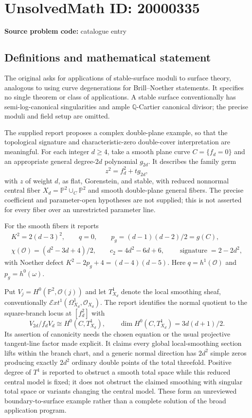 \documentclass[11pt]{article}
\newcommand{\Q}{\mathbb{Q}}
\newcommand{\PP}{\mathbb{P}}
\begin{document}
\section*{UnsolvedMath ID: 20000335}
\textbf{Source problem code:} catalogue entry
\subsection{Definitions and mathematical statement}
The original asks for applications of stable-surface moduli to surface theory, analogous to using curve degenerations for Brill--Noether statements. It specifies no single theorem or class of applications. A stable surface conventionally has semi-log-canonical singularities and ample $\Q$-Cartier canonical divisor; the precise moduli and field setup are omitted.

The supplied report proposes a complex double-plane example, so that the topological signature and characteristic-zero double-cover interpretation are meaningful. For each integer $d\geq4$, take a smooth plane curve $C=\{f_d=0\}$ and an appropriate general degree-$2d$ polynomial $g_{2d}$. It describes the family germ
\[
 z^2=f_d^2+t g_{2d},
\]
with $z$ of weight $d$, as flat, Gorenstein, and stable, with reduced nonnormal central fiber $X_d=\PP^2\cup_C\PP^2$ and smooth double-plane general fibers. The precise coefficient and parameter-open hypotheses are not supplied; this is not asserted for every fiber over an unrestricted parameter line.

For the smooth fibers it reports
\[
\begin{gathered}
 K^2=2(d-3)^2,\qquad q=0,\qquad
 p_g=(d-1)(d-2)/2=g(C),\\
 \chi(\mathcal O)=(d^2-3d+4)/2,\qquad
 c_2=4d^2-6d+6,\qquad\operatorname{signature}=2-2d^2,
\end{gathered}
\]
with Noether defect $K^2-2p_g+4=(d-4)(d-5)$. Here $q=h^1(\mathcal O)$ and $p_g=h^0(\omega)$.

Put $V_j=H^0(\PP^2,\mathcal O(j))$ and let $T^1_{X_d}$ denote the local smoothing sheaf, conventionally $\mathcal E xt^1(\Omega^1_{X_d},\mathcal O_{X_d})$. The report identifies the normal quotient to the square-branch locus at $[f_d^2]$ with
\[
 V_{2d}/f_dV_d\cong H^0(C,T^1_{X_d}),\qquad
 \dim H^0(C,T^1_{X_d})=3d(d+1)/2.
\]
Its assertion of canonicity needs the chosen equation or the usual projective tangent-line factor made explicit. It claims every global local-smoothing section lifts within the branch chart, and a generic normal direction has $2d^2$ simple zeros producing exactly $2d^2$ ordinary double points of the total threefold. Positive degree of $T^1$ is reported to obstruct a smooth total space while this reduced central model is fixed; it does not obstruct the claimed smoothing with singular total space or variants changing the central model. These form an unreviewed boundary-to-surface example rather than a complete solution of the broad application program.
\end{document}
